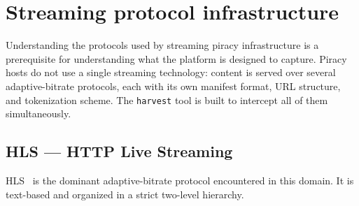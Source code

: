 \section{Streaming protocol infrastructure}

Understanding the protocols used by streaming piracy infrastructure is a prerequisite for
understanding what the platform is designed to capture. Piracy hosts do not use a single
streaming technology: content is served over several adaptive-bitrate protocols, each with
its own manifest format, URL structure, and tokenization scheme. The \texttt{harvest} tool
is built to intercept all of them simultaneously.

\subsection{HLS — HTTP Live Streaming}

HLS~\cite{hls-rfc} is the dominant adaptive-bitrate protocol encountered in this domain.
It is text-based and organized in a strict two-level hierarchy.

